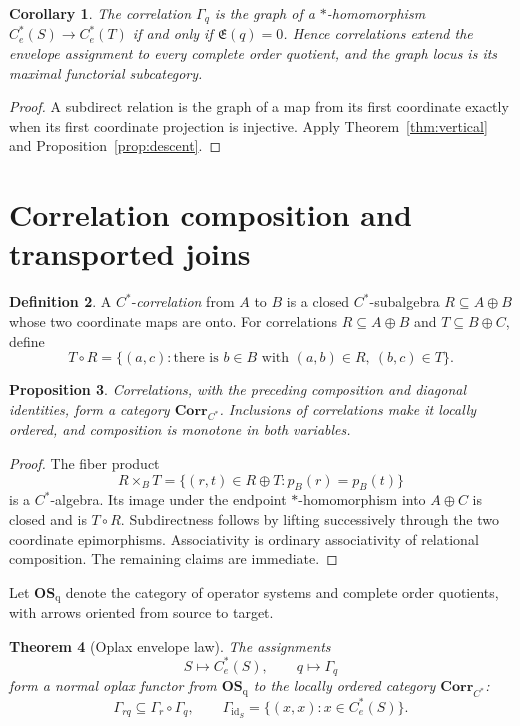 \documentclass[11pt,a4paper]{amsart}
\theoremstyle{plain}
\newtheorem{theorem}{Theorem}[section]
\newtheorem{proposition}[theorem]{Proposition}
\newtheorem{corollary}[theorem]{Corollary}
\theoremstyle{definition}
\newtheorem{definition}[theorem]{Definition}
\newcommand{\Ce}{C_e^*}
\newcommand{\Esc}{\mathfrak E}
\newcommand{\Corr}{\mathbf{Corr}_{C^*}}
\newcommand{\OSq}{\mathbf{OS}_{\mathrm q}}
\newcommand{\id}{\operatorname{id}}
\begin{document}
\begin{corollary}\label{cor:graph}
The correlation $\Gamma_q$ is the graph of a $*$-homomorphism
\(\Ce(S)\to\Ce(T)\) if and only if $\Esc(q)=0$.  Hence correlations extend the envelope
assignment to every complete order quotient, and the graph locus is its maximal functorial
subcategory.
\end{corollary}

\begin{proof}
A subdirect relation is the graph of a map from its first coordinate exactly when its first
coordinate projection is injective.  Apply Theorem~\ref{thm:vertical} and
Proposition~\ref{prop:descent}.
\end{proof}

\section{Correlation composition and transported joins}\label{sec:corr}

\begin{definition}
A $C^*$-\emph{correlation} from $A$ to $B$ is a closed $C^*$-subalgebra
$R\subseteq A\oplus B$ whose two coordinate maps are onto.  For correlations
$R\subseteq A\oplus B$ and $T\subseteq B\oplus C$, define
\[
 T\circ R=\{(a,c):\text{there is }b\in B\text{ with }(a,b)\in R,\ (b,c)\in T\}.
\]
\end{definition}

\begin{proposition}\label{prop:corr-category}
Correlations, with the preceding composition and diagonal identities, form a category $\Corr$.
Inclusions of correlations make it locally ordered, and composition is monotone in both
variables.
\end{proposition}

\begin{proof}
The fiber product
\[
 R\times_B T=\{(r,t)\in R\oplus T:p_B(r)=p_B(t)\}
\]
is a $C^*$-algebra.  Its image under the endpoint $*$-homomorphism into $A\oplus C$ is closed
and is $T\circ R$.  Subdirectness follows by lifting successively through the two coordinate
epimorphisms.  Associativity is ordinary associativity of relational composition.  The remaining
claims are immediate.
\end{proof}

Let $\OSq$ denote the category of operator systems and complete order quotients, with arrows
oriented from source to target.

\begin{theorem}[Oplax envelope law]\label{thm:oplax}
The assignments
\[
 S\longmapsto\Ce(S),\qquad q\longmapsto\Gamma_q
\]
form a normal oplax functor from $\OSq$ to the locally ordered category $\Corr$:
\[
 \Gamma_{rq}\subseteq\Gamma_r\circ\Gamma_q,\qquad
 \Gamma_{\id_S}=\{(x,x):x\in\Ce(S)\}.
\]
\end{theorem}
\end{document}
